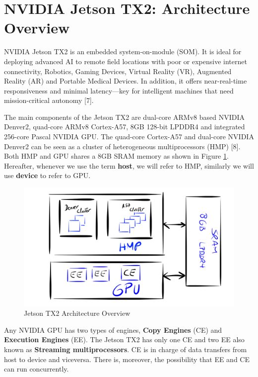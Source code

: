 \documentclass[
  12pt,
  a4paperpaper,
]{report}
\begin{document}
\hypertarget{nvidia-jetson-tx2-architecture-overview}{%
\section{NVIDIA Jetson TX2: Architecture
Overview}\label{nvidia-jetson-tx2-architecture-overview}}

NVIDIA Jetson TX2 is an embedded system-on-module (SOM). It is ideal for
deploying advanced AI to remote field locations with poor or expensive
internet connectivity, Robotics, Gaming Devices, Virtual Reality (VR),
Augmented Reality (AR) and Portable Medical Devices. In addition, it
offers near-real-time responsiveness and minimal latency---key for
intelligent machines that need mission-critical autonomy {[}7{]}.

The main components of the Jetson TX2 are dual-core ARMv8 based NVIDIA
Denver2, quad-core ARMv8 Cortex-A57, 8GB 128-bit LPDDR4 and integrated
256-core Pascal NVIDIA GPU. The quad-core Cortex-A57 and dual-core
NVIDIA Denver2 can be seen as a cluster of heterogeneous multiprocessors
(HMP) {[}8{]}. Both HMP and GPU shares a 8GB SRAM memory as shown in
Figure \ref{img:overview_arch}. Hereafter, whenever we use the term
\textbf{host}, we will refer to HMP, similarly we will use
\textbf{device} to refer to GPU.

\begin{figure}
\centering
\includegraphics[width=1\textwidth,height=\textheight]{source/figures/overview_arch.png}
\caption{Jetson TX2 Architecture Overview \label{img:overview_arch}}
\end{figure}

Any NVIDIA GPU has two types of engines, \textbf{Copy Engines} (CE) and
\textbf{Execution Engines} (EE). The Jetson TX2 has only one CE and two
EE also known as \textbf{Streaming multiprocessors}. CE is in charge of
data transfers from host to device and viceversa. There is, moreover,
the possibility that EE and CE can run concurrently.
\end{document}
